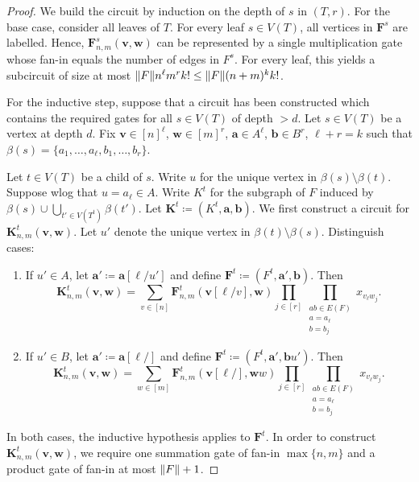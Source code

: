 \documentclass[10pt,a4paper]{article}
\theoremstyle{definition}
\theoremstyle{plain}
\theoremstyle{remark}
\DeclarePairedDelimiter{\norm}{\lVert}{\rVert}
\begin{document}
 	\begin{proof}
 		We build the circuit by induction on the depth of $s$ in $(T, r)$.
 		For the base case, consider all leaves of $T$.
 		For every leaf $s \in V(T)$,
 		all vertices in $ \boldsymbol{F}^s$ are labelled.
 		Hence,
 		$ \boldsymbol{F}^s_{n,m}(\boldsymbol{v},\boldsymbol{w})$ can be represented by a single multiplication gate whose fan-in equals the number of edges in $F^s$.
 		For every leaf, this yields a subcircuit of size at most $\norm{F} n^\ell m^r k! \leq \norm{F} (n+m)^k k!$.
 		
 		For the inductive step, suppose that a circuit has been constructed which contains the required gates for all $s \in V(T)$ of depth $> d$.
 		Let $s \in V(T)$ be a vertex at depth $d$.
 		Fix $\boldsymbol{v} \in [n]^\ell$,
 		$\boldsymbol{w} \in [m]^r$, $\boldsymbol{a} \in A^\ell$,
 		$\boldsymbol{b} \in B^r$,
 		$\ell +r = k$ such that
 		$\beta(s) = \{a_1, \dots, a_\ell, b_1, \dots, b_r\}$.
 		
 		Let $t \in V(T)$ be a child of $s$.
 		Write $u$ for the unique vertex in $\beta(s) \setminus \beta(t)$.
 		Suppose wlog that $u = a_\ell \in A$.
 		Write $K^t$ for the subgraph of $F$ induced by $\beta(s) \cup \bigcup_{t' \in V(T^t)} \beta(t')$.
 		Let $\boldsymbol{K}^t \coloneqq (K^t, \boldsymbol{a}, \boldsymbol{b})$.
 		We first construct a circuit for $\boldsymbol{K}^t_{n,m}(\boldsymbol{v}, \boldsymbol{w})$.
 		Let $u'$ denote the unique vertex in $\beta(t) \setminus \beta(s)$.
 		Distinguish cases:
 		\begin{enumerate}
 			\item If $u' \in A$, let $\boldsymbol{a}' \coloneqq \boldsymbol{a}[\ell/u']$ and define $\boldsymbol{F}^t \coloneqq (F^t, \boldsymbol{a}', \boldsymbol{b})$.
 				  Then
 				  \begin{equation}\label{eq:circuit1}
 				  \boldsymbol{K}^t_{n,m}(\boldsymbol{v}, \boldsymbol{w}) = \sum_{v \in [n]} \boldsymbol{F}^t_{n,m}(\boldsymbol{v}[\ell/v], \boldsymbol{w}) \prod_{j \in [r]} \prod_{\substack{a b \in E(F) \\ a = a_\ell \\ b = b_j}} x_{v_\ell w_j}.
 				  \end{equation}
 			\item If $u' \in B$, let $\boldsymbol{a}' \coloneqq \boldsymbol{a}[\ell/]$ and define $\boldsymbol{F}^t \coloneqq (F^t, \boldsymbol{a}', \boldsymbol{b}u')$.
 				  Then
 				  \begin{equation}\label{eq:circuit2}
 				  \boldsymbol{K}^t_{n,m}(\boldsymbol{v}, \boldsymbol{w}) = \sum_{w \in [m]} \boldsymbol{F}^t_{n,m}(\boldsymbol{v}[\ell/], \boldsymbol{w}w) \prod_{j \in [r]} \prod_{\substack{a b \in E(F) \\ a = a_\ell \\ b = b_j}} x_{v_\ell w_j}.
 				  \end{equation}
 		\end{enumerate}
 		In both cases, the inductive hypothesis applies to $\boldsymbol{F}^t$.
 		In order to construct $\boldsymbol{K}^t_{n,m}(\boldsymbol{v}, \boldsymbol{w})$, we require one summation gate of fan-in $\max\{n,m\}$
 		and a product gate of fan-in at most $\norm{F} + 1$.
 		

\end{proof}
\end{document}
